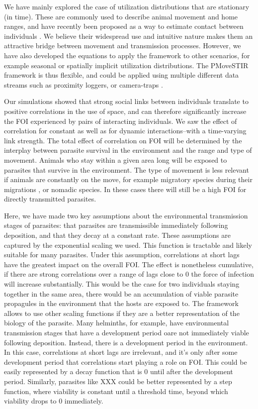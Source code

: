 \documentclass[letterpaper]{article}
\begin{document}
We have mainly explored the case of utilization distributions that are stationary (in time). These are commonly used to describe animal movement and home ranges, and have recently been proposed as a way to estimate contact between individuals \citep{Noonan2021}. 
We believe their widespread use and intuitive nature makes them an attractive bridge between movement and transmission processes. 
However, we have also developed the equations to apply the framework to other scenarios, for example seasonal or spatially implicit utilization distributions. 
The PMoveSTIR framework is thus flexible, and could be applied using multiple different data streams such as proximity loggers, or camera-traps \citep{Wilber2022}.

Our simulations showed that strong social links between individuals translate to positive correlations in the use of space, and can therefore significantly increase the FOI experienced by pairs of interacting individuals. 
We saw the effect of correlation for constant as well as for dynamic interactions--with a time-varying link strength. 
The total effect of correlation on FOI will be determined by the interplay between parasite survival in the environment and the range and type of movement. 
Animals who stay within a given area long will be exposed to parasites that survive in the environment. The type of movement is less relevant if animals are constantly on the move, for example migratory species during their migrations \citep{Peacock2018}, or nomadic species. In these cases there will still be a high FOI for directly transmitted parasites.


Here, we have made two key assumptions about the environmental transmission stages of parasites: that parasites are transmissible immediately following deposition, and that they decay at a constant rate. 
These assumptions are captured by the exponential scaling we used. This function is tractable and likely suitable for many parasites. Under this assumption, correlations at short lags have the greatest impact on the overall FOI. The effect is nonetheless cumulative, if there are strong correlations over a range of lags close to 0 the force of infection will increase substantially. This would be the case for two individuals staying together in the same area, there would be an accumulation of viable parasite propagules in the environment that the hosts are exposed to. 
The framework allows to use other scaling functions if they are a better representation of the biology of the parasite. 
Many helminths, for example, have environmental transmission stages that have a development period oare not immediately viable following deposition. Instead, there is a development period in the environment. In this case, correlations at short lags are irrelevant, and it's only after some development period that correlations start playing a role on FOI. This could be easily represented by a decay function that is 0 until after the development period. Similarly, parasites like XXX could be better represented by a step function, where viability is constant until a threshold time, beyond which viability drops to 0 immediately. 
\end{document}
